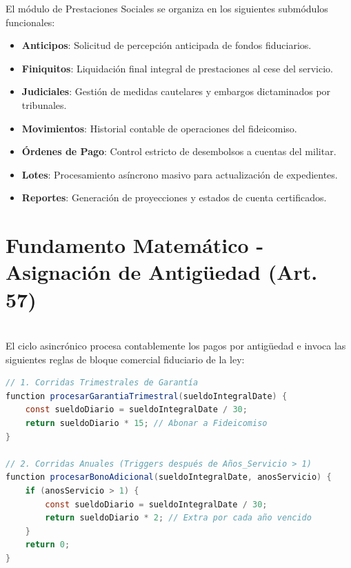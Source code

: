 El módulo de Prestaciones Sociales se organiza en los siguientes submódulos funcionales:

\begin{itemize}[label=\textcolor{sandraGreen}{}, leftmargin=*]
    \item \textbf{ Anticipos}: Solicitud de percepción anticipada de fondos fiduciarios.
    \item \textbf{ Finiquitos}: Liquidación final integral de prestaciones al cese del servicio.
    \item \textbf{ Judiciales}: Gestión de medidas cautelares y embargos dictaminados por tribunales.
    \item \textbf{ Movimientos}: Historial contable de operaciones del fideicomiso.
    \item \textbf{ Órdenes de Pago}: Control estricto de desembolsos a cuentas del militar.
    \item \textbf{ Lotes}: Procesamiento asíncrono masivo para actualización de expedientes.
    \item \textbf{ Reportes}: Generación de proyecciones y estados de cuenta certificados.
\end{itemize}

\section{Fundamento Matemático - Asignación de Antigüedad (Art. 57)}

\\
El ciclo asincrónico procesa contablemente los pagos por antigüedad e invoca las siguientes reglas de bloque comercial fiduciario de la ley:

\begin{lstlisting}[language=Java, caption=Cálculos Fiduciarios de Antigüedad]
// 1. Corridas Trimestrales de Garantía
function procesarGarantiaTrimestral(sueldoIntegralDate) {
    const sueldoDiario = sueldoIntegralDate / 30;
    return sueldoDiario * 15; // Abonar a Fideicomiso
}

// 2. Corridas Anuales (Triggers después de Años_Servicio > 1)
function procesarBonoAdicional(sueldoIntegralDate, anosServicio) {
    if (anosServicio > 1) {
        const sueldoDiario = sueldoIntegralDate / 30;
        return sueldoDiario * 2; // Extra por cada año vencido
    }
    return 0;
}
\end{lstlisting}

